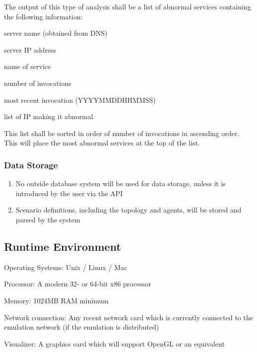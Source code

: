 \documentclass[titlepage]{article}
\begin{document}
The output of this type of analysis shall be a list of abnormal services
containing the following information:
\begin{itemize*}
    \item server name (obtained from DNS)
    \item server IP address
    \item name of service
    \item number of invocations
    \item most recent invocation (YYYYMMDDHHMMSS)
    \item list of IP making it abnormal
\end{itemize*}
This list shall be sorted in order of number of invocations in ascending order.
This will place the most abnormal services at the top of the list.


\subsubsection{Data Storage%
  \label{data-storage}%
}
  \begin{enumerate}
    \item No outside database system will be used for data storage, unless it is introduced by the user via the API
    \item Scenario definitions, including the topology and agents, will be stored and parsed by the system
  \end{enumerate}


\subsection{Runtime Environment} 
\begin{itemize*}
    \item Operating Systems:  Unix / Linux / Mac
    \item Processor:  A modern 32- or 64-bit x86 processor
    \item Memory:  1024MB RAM minimum
    \item Network connection:  Any recent network card which is currently connected to the emulation network (if the emulation is distributed)
    \item Visualizer:  A graphics card which will support OpenGL or an equivalent
\end{itemize*}
\end{document}
